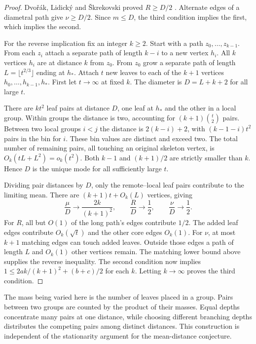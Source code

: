\documentclass[11pt,a4paper]{article}
\begin{document}
\begin{proof}
Dvořák, Lidický and Škrekovski proved $R\ge D/2$ \cite{dls}. Alternate edges of a diametral path give $\nu\ge D/2$. Since $m\le D$, the third condition implies the first, which implies the second.

For the reverse implication fix an integer $k\ge2$. Start with a path $z_0,\ldots,z_{k-1}$. From each $z_i$ attach a separate path of length $k-i$ to a new vertex $h_i$. All $k$ vertices $h_i$ are at distance $k$ from $z_0$. From $z_0$ grow a separate path of length $L=\lfloor t^{2/3}\rfloor$ ending at $h_*$. Attach $t$ new leaves to each of the $k+1$ vertices $h_0,\ldots,h_{k-1},h_*$. First let $t\to\infty$ at fixed $k$. The diameter is $D=L+k+2$ for all large $t$.

There are $kt^2$ leaf pairs at distance $D$, one leaf at $h_*$ and the other in a local group. Within groups the distance is two, accounting for $(k+1)\binom{t}{2}$ pairs. Between two local groups $i<j$ the distance is $2(k-i)+2$, with $(k-1-i)t^2$ pairs in the bin for $i$. These bin values are distinct and exceed two. The total number of remaining pairs, all touching an original skeleton vertex, is $O_k(tL+L^2)=o_k(t^2)$. Both $k-1$ and $(k+1)/2$ are strictly smaller than $k$. Hence $D$ is the unique mode for all sufficiently large $t$.

Dividing pair distances by $D$, only the remote--local leaf pairs contribute to the limiting mean. There are $(k+1)t+O_k(L)$ vertices, giving
\[
 \frac{\mu}{D}\longrightarrow\frac{2k}{(k+1)^2},\qquad
 \frac{R}{D}\longrightarrow\frac12,\qquad
 \frac{\nu}{D}\longrightarrow\frac12.
\]
For $R$, all but $O(1)$ of the long path's edges contribute $1/2$. The added leaf edges contribute $O_k(\sqrt t)$ and the other core edges $O_k(1)$. For $\nu$, at most $k+1$ matching edges can touch added leaves. Outside those edges a path of length $L$ and $O_k(1)$ other vertices remain. The matching lower bound above supplies the reverse inequality.
The second condition now implies $1\le 2ak/(k+1)^2+(b+c)/2$ for each $k$. Letting $k\to\infty$ proves the third condition.
\end{proof}
The mass being varied here is the number of leaves placed in a group. Pairs between two groups are counted by the product of their masses. Equal depths concentrate many pairs at one distance, while choosing different branching depths distributes the competing pairs among distinct distances. This construction is independent of the stationarity argument for the mean-distance conjecture.
\end{document}
